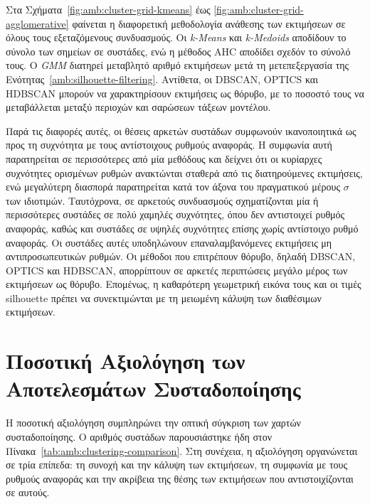 \clearpage

Στα Σχήματα~\ref{fig:amb:cluster-grid-kmeans} έως
\ref{fig:amb:cluster-grid-agglomerative} φαίνεται η διαφορετική μεθοδολογία
ανάθεσης των εκτιμήσεων σε όλους τους εξεταζόμενους συνδυασμούς. Οι
\textenglish{\textit{k-Means}} και \textenglish{\textit{k-Medoids}} αποδίδουν το σύνολο των σημείων σε
συστάδες, ενώ η μέθοδος AHC αποδίδει σχεδόν το σύνολό τους. Ο
\textenglish{\textit{GMM}} διατηρεί μεταβλητό αριθμό εκτιμήσεων μετά τη μετεπεξεργασία της
Ενότητας~\ref{amb:silhouette-filtering}. Αντίθετα, οι DBSCAN, OPTICS και
HDBSCAN μπορούν να χαρακτηρίσουν εκτιμήσεις ως θόρυβο, με το ποσοστό τους να
μεταβάλλεται μεταξύ περιοχών και σαρώσεων τάξεων μοντέλου.

Παρά τις διαφορές αυτές, οι θέσεις αρκετών συστάδων συμφωνούν ικανοποιητικά
ως προς τη συχνότητα με τους αντίστοιχους ρυθμούς αναφοράς. Η συμφωνία αυτή
παρατηρείται σε περισσότερες από μία μεθόδους και δείχνει ότι οι κυρίαρχες
συχνότητες ορισμένων ρυθμών ανακτώνται σταθερά από τις διατηρούμενες εκτιμήσεις, ενώ μεγαλύτερη διασπορά παρατηρείται κατά τον άξονα του πραγματικού μέρους $\sigma$ των ιδιοτιμών.
Ταυτόχρονα, σε αρκετούς συνδυασμούς σχηματίζονται μία ή περισσότερες συστάδες
σε πολύ χαμηλές συχνότητες, όπου δεν αντιστοιχεί ρυθμός αναφοράς, καθώς και
συστάδες σε υψηλές συχνότητες επίσης χωρίς αντίστοιχο ρυθμό αναφοράς. Οι
συστάδες αυτές υποδηλώνουν επαναλαμβανόμενες εκτιμήσεις μη
αντιπροσωπευτικών ρυθμών. Οι μέθοδοι που επιτρέπουν θόρυβο, δηλαδή DBSCAN, OPTICS και HDBSCAN, απορρίπτουν
σε αρκετές περιπτώσεις μεγάλο μέρος των εκτιμήσεων ως θόρυβο. Επομένως, η
καθαρότερη γεωμετρική εικόνα τους και οι
τιμές silhouette πρέπει να συνεκτιμώνται με τη μειωμένη κάλυψη των
διαθέσιμων εκτιμήσεων.

\section{Ποσοτική Αξιολόγηση των Αποτελεσμάτων Συσταδοποίησης}

Η ποσοτική αξιολόγηση συμπληρώνει την οπτική σύγκριση των χαρτών συσταδοποίησης.
Ο αριθμός συστάδων παρουσιάστηκε ήδη στον Πίνακα~\ref{tab:amb:clustering-comparison}.
Στη συνέχεια, η αξιολόγηση οργανώνεται σε τρία επίπεδα: τη συνοχή και την κάλυψη των εκτιμήσεων, τη συμφωνία με τους ρυθμούς αναφοράς
και την ακρίβεια της θέσης των εκτιμήσεων που αντιστοιχίζονται σε αυτούς.

